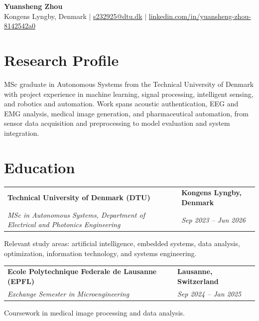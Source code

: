 \documentclass[a4paper,11pt]{article}
\makeatletter
\newcommand{\educationEntry}[4]{%
  \noindent
  \begin{tabularx}{\textwidth}{@{}X>{\raggedleft\arraybackslash}p{3.55cm}@{}}
    \textbf{#1} & \textbf{#2} \\
    \textit{#3} & \textit{#4}
  \end{tabularx}
  \vspace{0.34em}
}
\makeatother
\begin{document}
\begin{center}
  {\Huge\bfseries Yuansheng Zhou}\\[0.26em]
  {\small
  Kongens Lyngby, Denmark
  \enspace $|$ \enspace
  \href{mailto:s232925@dtu.dk}{s232925@dtu.dk}
  \enspace $|$ \enspace
  \href{https://www.linkedin.com/in/yuansheng-zhou-8142542a0/}{linkedin.com/in/yuansheng-zhou-8142542a0}
  }
\end{center}

\vspace{-0.10em}

\section{Research Profile}

\small
MSc graduate in Autonomous Systems from the Technical University of Denmark with project experience in machine learning, signal processing, intelligent sensing, and robotics and automation. Work spans acoustic authentication, EEG and EMG analysis, medical image generation, and pharmaceutical automation, from sensor data acquisition and preprocessing to model evaluation and system integration.
\normalsize

\section{Education}

\educationEntry
  {Technical University of Denmark (DTU)}
  {Kongens Lyngby, Denmark}
  {MSc in Autonomous Systems, Department of Electrical and Photonics Engineering}
  {Sep 2023 -- Jun 2026}

\small
Relevant study areas: artificial intelligence, embedded systems, data analysis, optimization, information technology, and systems engineering.
\normalsize
\vspace{0.34em}

\educationEntry
  {Ecole Polytechnique Federale de Lausanne (EPFL)}
  {Lausanne, Switzerland}
  {Exchange Semester in Microengineering}
  {Sep 2024 -- Jan 2025}

\small
Coursework in medical image processing and data analysis.
\normalsize
\vspace{0.34em}
\end{document}
